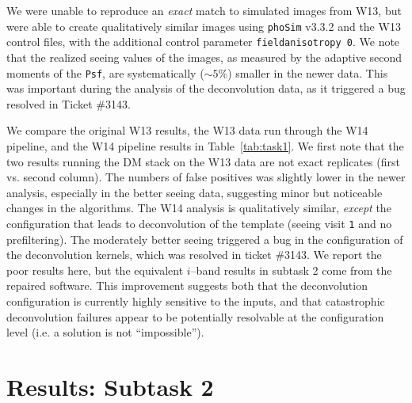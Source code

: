\documentclass[prd, nofootinbib, floatfix, 11pt, tightenlines, times]{article}
\begin{document}
We were unable to reproduce an {\it exact} match to simulated images
from W13, but were able to create qualitatively similar images using
{\tt phoSim} v3.3.2 and the W13 control files, with the additional
control parameter {\tt fieldanisotropy 0}.  We note that the realized
seeing values of the images, as measured by the adaptive second
moments of the {\tt Psf}, are systematically ($\sim 5\%$) smaller in
the newer data.  This was important during the analysis of the
deconvolution data, as it triggered a bug resolved in Ticket \#3143.

We compare the original W13 results, the W13 data run through the W14
pipeline, and the W14 pipeline results in Table~\ref{tab:task1}.  We
first note that the two results running the DM stack on the W13 data
are not exact replicates (first vs. second column). The numbers of
false positives was slightly lower in the newer analysis, especially
in the better seeing data, suggesting minor but noticeable changes in
the algorithms.  The W14 analysis is qualitatively similar, {\it
  except} the configuration that leads to deconvolution of the
template (seeing visit {\tt 1} and no prefiltering).  The moderately
better seeing triggered a bug in the configuration of the
deconvolution kernels, which was resolved in ticket \#3143.  We report
the poor results here, but the equivalent $i$--band results in subtask
2 come from the repaired software.  This improvement suggests both
that the deconvolution configuration is currently highly sensitive to
the inputs, and that catastrophic deconvolution failures appear to be
potentially resolvable at the configuration level (i.e. a solution is
not ``impossible'').

\section{Results: Subtask 2 \label{sec:task2}}
\end{document}
